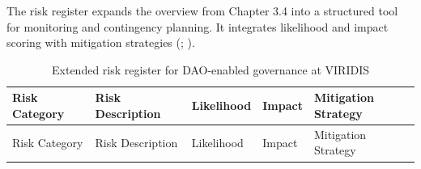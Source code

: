 \documentclass[
  english,
  12pt,
  oneside,
  open=any]{scrbook}
\begin{document}
The risk register expands the overview from Chapter 3.4 into a
structured tool for monitoring and contingency planning. It integrates
likelihood and impact scoring with mitigation strategies
(;
).

\begin{longtable}[]{@{}
  >{\raggedright\arraybackslash}p{}
  >{\raggedright\arraybackslash}p{}
  >{\raggedright\arraybackslash}p{}
  >{\raggedright\arraybackslash}p{}
  >{\raggedright\arraybackslash}p{}@{}}
\caption{Extended risk register for DAO-enabled governance at
VIRIDIS}\label{tbl-risk-register}\tabularnewline
\toprule\noalign{}
\begin{minipage}[b]{\linewidth}\raggedright
Risk Category
\end{minipage} & \begin{minipage}[b]{\linewidth}\raggedright
Risk Description
\end{minipage} & \begin{minipage}[b]{\linewidth}\raggedright
Likelihood
\end{minipage} & \begin{minipage}[b]{\linewidth}\raggedright
Impact
\end{minipage} & \begin{minipage}[b]{\linewidth}\raggedright
Mitigation Strategy
\end{minipage} \\
\midrule\noalign{}
\endfirsthead
\toprule\noalign{}
\begin{minipage}[b]{\linewidth}\raggedright
Risk Category
\end{minipage} & \begin{minipage}[b]{\linewidth}\raggedright
Risk Description
\end{minipage} & \begin{minipage}[b]{\linewidth}\raggedright
Likelihood
\end{minipage} & \begin{minipage}[b]{\linewidth}\raggedright
Impact
\end{minipage} & \begin{minipage}[b]{\linewidth}\raggedright
Mitigation Strategy
\end{minipage} \\

\end{longtable}
\end{document}
